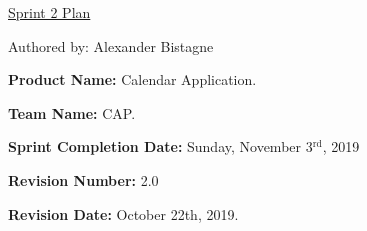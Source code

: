 \documentclass[2pt]{article}
\begin{document}
    \begin{center}
        \underline{Sprint 2 Plan}
        \item Authored by: Alexander Bistagne
    \end{center}

    \begin{flushleft}
        \item \textbf{Product Name: }Calendar Application.
        \item \textbf{Team Name: } CAP.
        \item \textbf{Sprint Completion Date: } Sunday, November 3$^{\text{rd}}$, 2019
        \item \textbf{Revision Number: } 2.0
        \item \textbf{Revision Date: } October 22th, 2019.
        

\end{flushleft}
\end{document}
